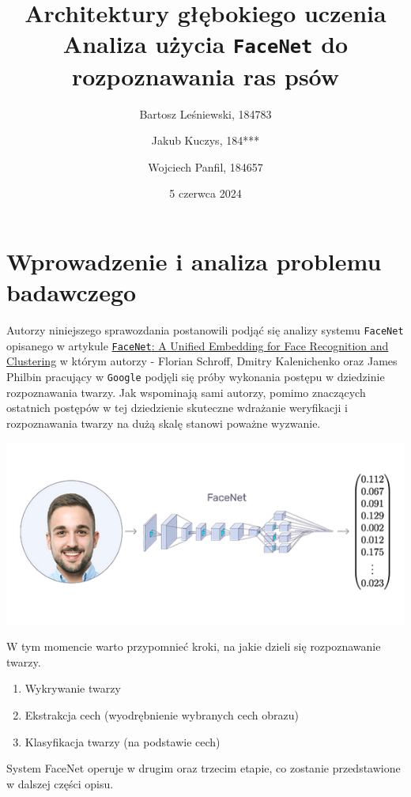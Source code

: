 \documentclass[11pt]{article}
\title{
	\textbf{Architektury głębokiego uczenia}\\
	Analiza użycia \texttt{FaceNet} do rozpoznawania ras psów}
\author{
        Bartosz Leśniewski, 184783
        \and
        Jakub Kuczys, 184***
        \and
        Wojciech Panfil, 184657
      }
\date{5 czerwca 2024}
\begin{document}
    \maketitle

    \justify

    \section{Wprowadzenie i analiza problemu badawczego}

    Autorzy niniejszego sprawozdania postanowili podjąć się analizy systemu \texttt{FaceNet} opisanego w artykule
    \href{https://arxiv.org/abs/1503.03832}{\texttt{FaceNet}: A Unified Embedding for Face Recognition and Clustering}
    w którym autorzy - Florian Schroff, Dmitry Kalenichenko oraz James Philbin pracujący w \texttt{Google} podjęli się próby wykonania postępu
    w dziedzinie rozpoznawania twarzy. Jak wspominają sami autorzy, pomimo znaczących ostatnich postępów w tej dziedzienie
    skuteczne wdrażanie weryfikacji i rozpoznawania twarzy na dużą skalę stanowi poważne wyzwanie. 
    \begin{center}
    \includegraphics{facenet_arch.png}
    \end{center}

    W tym momencie warto przypomnieć kroki, na jakie dzieli się rozpoznawanie twarzy.
    \begin{enumerate}
        \item Wykrywanie twarzy
        \item Ekstrakcja cech (wyodrębnienie wybranych cech obrazu)
        \item Klasyfikacja twarzy (na podstawie cech)
    \end{enumerate}
    System FaceNet operuje w drugim oraz trzecim etapie, co zostanie przedstawione w dalszej części opisu.
\end{document}
